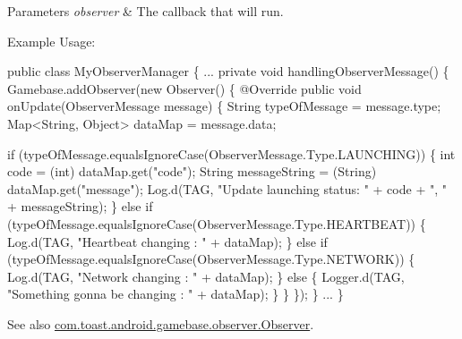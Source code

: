 \begin{DoxyParams}{Parameters}
{\em observer} & The callback that will run.\\
\hline
\end{DoxyParams}
Example Usage\+: 
\begin{DoxyCode}
\textcolor{keyword}{public} \textcolor{keyword}{class }MyObserverManager \{
    ...
    \textcolor{keyword}{private} \textcolor{keywordtype}{void} handlingObserverMessage() \{
        Gamebase.addObserver(\textcolor{keyword}{new} Observer() \{
             @Override
             \textcolor{keyword}{public} \textcolor{keywordtype}{void} onUpdate(ObserverMessage message) \{
                 String typeOfMessage = message.type;
                 Map<String, Object> dataMap = message.data;

                 \textcolor{keywordflow}{if} (typeOfMessage.equalsIgnoreCase(ObserverMessage.Type.LAUNCHING)) \{
                     \textcolor{keywordtype}{int} code = (int) dataMap.get(\textcolor{stringliteral}{"code"});
                     String messageString = (String) dataMap.get(\textcolor{stringliteral}{"message"});
                     Log.d(TAG, \textcolor{stringliteral}{"Update launching status: "} + code + \textcolor{stringliteral}{", "} + messageString);
                 \} \textcolor{keywordflow}{else} \textcolor{keywordflow}{if} (typeOfMessage.equalsIgnoreCase(ObserverMessage.Type.HEARTBEAT)) \{
                     Log.d(TAG, \textcolor{stringliteral}{"Heartbeat changing : "} + dataMap);
                 \} \textcolor{keywordflow}{else} \textcolor{keywordflow}{if} (typeOfMessage.equalsIgnoreCase(ObserverMessage.Type.NETWORK)) \{
                     Log.d(TAG, \textcolor{stringliteral}{"Network changing : "} + dataMap);
                 \} \textcolor{keywordflow}{else} \{
                     Logger.d(TAG, \textcolor{stringliteral}{"Something gonna be changing : "} + dataMap);
                 \}
             \}
         \});
     \}
     ...
\}
\end{DoxyCode}


\begin{DoxySeeAlso}{See also}
\hyperlink{interfacecom_1_1toast_1_1android_1_1gamebase_1_1observer_1_1_observer}{com.\+toast.\+android.\+gamebase.\+observer.\+Observer}. 
\end{DoxySeeAlso}
\mbox{\label{classcom_1_1toast_1_1android_1_1gamebase_1_1_gamebase_a1cae88da5b12ad9563fbfa619870f11b}} 
